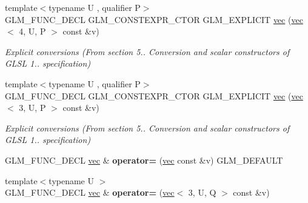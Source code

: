 \begin{DoxyCompactItemize}
\mbox{\label{structglm_1_1vec_3_013_00_01T_00_01Q_01_4_a6a3c6e504114be5310317d725eda50ea}} 
{\footnotesize template$<$typename U , qualifier P$>$ }\\G\+L\+M\+\_\+\+F\+U\+N\+C\+\_\+\+D\+E\+CL G\+L\+M\+\_\+\+C\+O\+N\+S\+T\+E\+X\+P\+R\+\_\+\+C\+T\+OR G\+L\+M\+\_\+\+E\+X\+P\+L\+I\+C\+IT \hyperlink{structglm_1_1vec_3_013_00_01T_00_01Q_01_4_a6a3c6e504114be5310317d725eda50ea}{vec} (\hyperlink{structglm_1_1vec}{vec}$<$ 4, U, P $>$ const \&v)
\begin{DoxyCompactList}\small\item\em Explicit conversions (From section 5.. Conversion and scalar constructors of G\+L\+SL 1.. specification) \end{DoxyCompactList}\item 
\mbox{\label{structglm_1_1vec_3_013_00_01T_00_01Q_01_4_a47d23576cd135fb6f6b964ed9d4e3599}} 
{\footnotesize template$<$typename U , qualifier P$>$ }\\G\+L\+M\+\_\+\+F\+U\+N\+C\+\_\+\+D\+E\+CL G\+L\+M\+\_\+\+C\+O\+N\+S\+T\+E\+X\+P\+R\+\_\+\+C\+T\+OR G\+L\+M\+\_\+\+E\+X\+P\+L\+I\+C\+IT \hyperlink{structglm_1_1vec_3_013_00_01T_00_01Q_01_4_a47d23576cd135fb6f6b964ed9d4e3599}{vec} (\hyperlink{structglm_1_1vec}{vec}$<$ 3, U, P $>$ const \&v)
\begin{DoxyCompactList}\small\item\em Explicit conversions (From section 5.. Conversion and scalar constructors of G\+L\+SL 1.. specification) \end{DoxyCompactList}\item 
\mbox{\label{structglm_1_1vec_3_013_00_01T_00_01Q_01_4_a8dcea394dcaf4ef0b49e0aab62bdd291}} 
G\+L\+M\+\_\+\+F\+U\+N\+C\+\_\+\+D\+E\+CL \hyperlink{structglm_1_1vec}{vec} \& {\bfseries operator=} (\hyperlink{structglm_1_1vec}{vec} const \&v) G\+L\+M\+\_\+\+D\+E\+F\+A\+U\+LT
\item 
\mbox{\label{structglm_1_1vec_3_013_00_01T_00_01Q_01_4_a4853e242c3e757554ca9f02c4c48dd05}} 
{\footnotesize template$<$typename U $>$ }\\G\+L\+M\+\_\+\+F\+U\+N\+C\+\_\+\+D\+E\+CL \hyperlink{structglm_1_1vec}{vec} \& {\bfseries operator=} (\hyperlink{structglm_1_1vec}{vec}$<$ 3, U, Q $>$ const \&v)

\end{DoxyCompactItemize}
